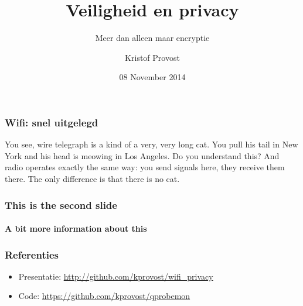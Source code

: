 \documentclass{beamer}
\title{Veiligheid en privacy}
\subtitle{Meer dan alleen maar encryptie}
\author{Kristof Provost}
\date{08 November 2014}
\begin{document}
  \frame{\titlepage}

  \begin{frame}
    \frametitle{Wifi: snel uitgelegd}
    You see, wire telegraph is a kind of a very, very long cat.  You pull his
    tail in New York and his head is meowing in Los Angeles.  Do you understand
    this? And radio operates exactly the same way: you send signals here, they
    receive them there.  The only difference is that there is no cat.
  \end{frame}

  \begin{frame}
    \frametitle{This is the second slide}
    \framesubtitle{A bit more information about this}
  \end{frame}

  \begin{frame}
    \frametitle{Referenties}
    \begin{itemize}
        \item Presentatie: \url{http://github.com/kprovost/wifi_privacy}
        \item Code: \url{https://github.com/kprovost/qprobemon}
    \end{itemize}
  \end{frame}
\end{document}
